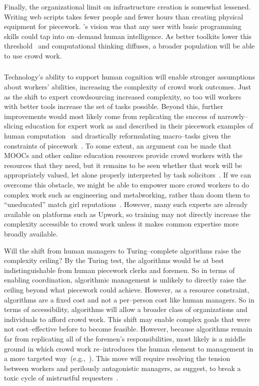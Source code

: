 \documentclass[trackingWork]{subfiles}
\begin{document}
Finally, the organizational limit on infrastructure creation is somewhat lessened. Writing web scripts takes fewer people and fewer hours than creating physical equipment for piecework.
\citeauthor{turkitLittle}'s vision was that any user with basic programming skills could tap into on--demand human intelligence.
As better toolkits lower this threshold~\cite{myers2000past} and computational thinking diffuses, a broader population will be able to use crowd work.

\subsubsection{\implication}
Technology's ability to support human cognition will enable stronger assumptions about workers' abilities, increasing the complexity of crowd work outcomes.
Just as the shift to expert crowdsourcing increased complexity, so too will workers with better tools increase the set of tasks possible.
Beyond this, further improvements would most likely come from replicating the success of narrowly--slicing education for expert work as \citeauthor{hart2013rise} and \citeauthor{grier2013computers} described in their piecework examples
of human computation~\cite{grier2013computers} and drastically reformulating macro--tasks given the constraints of piecework~\cite{hart2013rise}.
To some extent, an argument can be made that
MOOCs and other online education resources
provide crowd workers with the resources that they need, but 
it remains to be seen whether that work will be appropriately valued, let alone
properly interpreted by task solicitors~\cite{aguaded2013mooc}.
If we can overcome this obstacle,
we might be able to empower more crowd workers to do complex work such as engineering and metalworking,
rather than doom them to ``uneducated'' match girl reputations~\cite{10.2307/3827491}.
However, many such experts are already available on platforms such as Upwork, so training may not directly increase the complexity accessible to crowd work unless it makes common expertise more broadly available.

Will the shift from human managers to Turing--complete algorithms raise the complexity ceiling? 
By the Turing test, the algorithms would be at best indistinguishable from human piecework clerks and foremen.
So in terms of enabling coordination, algorithmic management is unlikely to directly raise the ceiling beyond what piecework could achieve.
However, as a resource constraint, algorithms are a fixed cost and not a per--person cost like human managers.
So in terms of accessibility, algorithms will allow a broader class of organizations and individuals to afford crowd work.
This shift may enable complex goals that were not cost--effective before to become feasible.
However, because algorithms remain far from replicating all of the foremen's responsibilities, most likely is a middle ground in which crowd work re--introduces the human element to management in a more targeted way~(e.g.,~\cite{haas2015argonaut,kulkarni2012mobileworks,crowdguilds}).
This move will require resolving the tension between workers and perilously antagonistic managers, as \citeauthor{10.2307/2118435} suggest, to break a toxic cycle of mistrustful requesters~\cite{MaliciousCrowdworkersGadiraju}.
\end{document}

